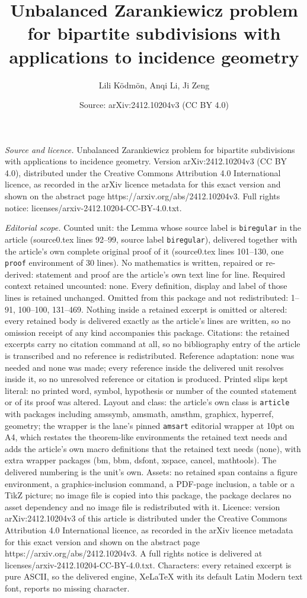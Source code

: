 \documentclass[10pt,a4paper]{amsart}
\title[Unbalanced Zarankiewicz problem for bipartite subdivisions w]{Unbalanced Zarankiewicz problem for bipartite subdivisions with applications to incidence geometry}
\author{Lili K\"odm\"on, Anqi Li, Ji Zeng}
\date{Source: arXiv:2412.10204v3 (CC BY 4.0)}
\begin{document}
\maketitle

\noindent\emph{Source and licence.} Unbalanced Zarankiewicz problem for bipartite subdivisions with applications to incidence geometry. Version arXiv:2412.10204v3 (CC BY 4.0), distributed under the Creative Commons Attribution 4.0 International licence, as recorded in the arXiv licence metadata for this exact version and shown on the abstract page https://arxiv.org/abs/2412.10204v3. Full rights notice: licenses/arxiv-2412.10204-CC-BY-4.0.txt.\par\smallskip

\noindent\textit{Editorial scope.} Counted unit: the Lemma whose source label is \texttt{biregular} in the article (source0.tex lines 92--99, source label \texttt{biregular}), delivered together with the article's own complete original proof of it (source0.tex lines 101--130, one \texttt{proof} environment of 30 lines). No mathematics is written, repaired or re-derived: statement and proof are the article's own text line for line. Required context retained uncounted: none. Every definition, display and label of those lines is retained unchanged. Omitted from this package and not redistributed: 1--91, 100--100, 131--469. Nothing inside a retained excerpt is omitted or altered: every retained body is delivered exactly as the article's lines are written, so no omission receipt of any kind accompanies this package. Citations: the retained excerpts carry no citation command at all, so no bibliography entry of the article is transcribed and no reference is redistributed. Reference adaptation: none was needed and none was made; every reference inside the delivered unit resolves inside it, so no unresolved reference or citation is produced. Printed slips kept literal: no printed word, symbol, hypothesis or number of the counted statement or of its proof was altered. Layout and class: the article's own class is \texttt{article} with packages including amssymb, amsmath, amsthm, graphicx, hyperref, geometry; the wrapper is the lane's pinned \texttt{amsart} editorial wrapper at 10pt on A4, which restates the theorem-like environments the retained text needs and adds the article's own macro definitions that the retained text needs (none), with extra wrapper packages (bm, bbm, dsfont, xspace, cancel, mathtools). The delivered numbering is the unit's own. Assets: no retained span contains a figure environment, a graphics-inclusion command, a PDF-page inclusion, a table or a TikZ picture; no image file is copied into this package, the package declares no asset dependency and no image file is redistributed with it. Licence: version arXiv:2412.10204v3 of this article is distributed under the Creative Commons Attribution 4.0 International licence, as recorded in the arXiv licence metadata for this exact version and shown on the abstract page https://arxiv.org/abs/2412.10204v3. A full rights notice is delivered at licenses/arxiv-2412.10204-CC-BY-4.0.txt. Characters: every retained excerpt is pure ASCII, so the delivered engine, XeLaTeX with its default Latin Modern text font, reports no missing character.
\end{document}
